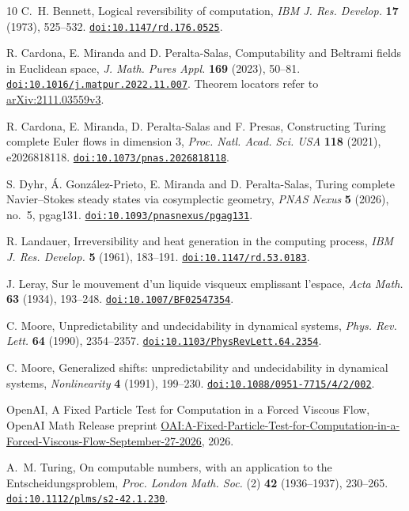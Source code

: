 \begin{thebibliography}{10}
 C.~H. Bennett, Logical reversibility of computation,
\emph{IBM J. Res. Develop.} \textbf{17} (1973), 525--532.
\href{https://doi.org/10.1147/rd.176.0525}{\nolinkurl{doi:10.1147/rd.176.0525}}.

R. Cardona, E. Miranda and D. Peralta-Salas,
Computability and Beltrami fields in Euclidean space,
\emph{J. Math. Pures Appl.} \textbf{169} (2023), 50--81.
\href{https://doi.org/10.1016/j.matpur.2022.11.007}{\nolinkurl{doi:10.1016/j.matpur.2022.11.007}}.
Theorem locators refer to \href{https://arxiv.org/abs/2111.03559v3}{arXiv:2111.03559v3}.

 R. Cardona, E. Miranda, D. Peralta-Salas and F. Presas,
Constructing Turing complete Euler flows in dimension 3,
\emph{Proc. Natl. Acad. Sci. USA} \textbf{118} (2021), e2026818118.
\href{https://doi.org/10.1073/pnas.2026818118}{\nolinkurl{doi:10.1073/pnas.2026818118}}.

S. Dyhr, \'A. Gonz\'alez-Prieto, E. Miranda and D. Peralta-Salas,
Turing complete Navier--Stokes steady states via cosymplectic geometry,
\emph{PNAS Nexus} \textbf{5} (2026), no.~5, pgag131.
\href{https://doi.org/10.1093/pnasnexus/pgag131}{\nolinkurl{doi:10.1093/pnasnexus/pgag131}}.

 R. Landauer, Irreversibility and heat generation in
the computing process, \emph{IBM J. Res. Develop.} \textbf{5} (1961),
183--191.
\href{https://doi.org/10.1147/rd.53.0183}{\nolinkurl{doi:10.1147/rd.53.0183}}.

 J. Leray, Sur le mouvement d'un liquide visqueux
emplissant l'espace, \emph{Acta Math.} \textbf{63} (1934), 193--248.
\href{https://doi.org/10.1007/BF02547354}{\nolinkurl{doi:10.1007/BF02547354}}.

 C. Moore, Unpredictability and undecidability in
dynamical systems, \emph{Phys. Rev. Lett.} \textbf{64} (1990), 2354--2357.
\href{https://doi.org/10.1103/PhysRevLett.64.2354}{\nolinkurl{doi:10.1103/PhysRevLett.64.2354}}.

 C. Moore, Generalized shifts: unpredictability and
undecidability in dynamical systems, \emph{Nonlinearity} \textbf{4}
(1991), 199--230.
\href{https://doi.org/10.1088/0951-7715/4/2/002}{\nolinkurl{doi:10.1088/0951-7715/4/2/002}}.

OpenAI, A Fixed Particle Test for Computation in a Forced Viscous Flow,
OpenAI Math Release preprint
\href{https://github.com/openai/math/blob/main/preprints/A-Fixed-Particle-Test-for-Computation-in-a-Forced-Viscous-Flow-September-27-2026/manuscript.pdf}{OAI:A-Fixed-Particle-Test-for-Computation-in-a-Forced-Viscous-Flow-September-27-2026},
2026.

 A.~M. Turing, On computable numbers, with an application
to the Entscheidungsproblem, \emph{Proc. London Math. Soc.} (2)
\textbf{42} (1936--1937), 230--265.
\href{https://doi.org/10.1112/plms/s2-42.1.230}{\nolinkurl{doi:10.1112/plms/s2-42.1.230}}.
\end{thebibliography}
